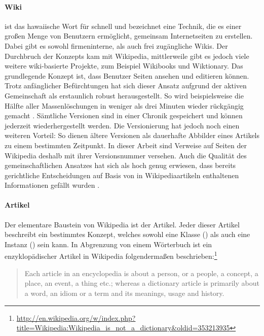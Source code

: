 \paragraph{Wiki}
ist das hawaiische Wort für schnell und bezeichnet eine Technik, die es einer großen Menge von Benutzern ermöglicht, gemeinsam Internetseiten zu erstellen.
Dabei gibt es sowohl firmeninterne, als auch frei zugängliche Wikis.
Der Durchbruch der Konzepts kam mit Wikipedia, mittlerweile gibt es jedoch viele weitere wiki-basierte Projekte, zum Beispiel Wikibooks und Wiktionary.
Das grundlegende Konzept ist, dass Benutzer Seiten ansehen und editieren können.
Trotz anfänglicher Befürchtungen hat sich dieser Ansatz aufgrund der aktiven Gemeinschaft als erstaunlich robust herausgestellt.
So wird beispielsweise die Hälfte aller Massenlöschungen in weniger als drei Minuten wieder rückgängig gemacht \citep[Seite 579]{wikipedia-vandalism}.
Sämtliche Versionen sind in einer Chronik gespeichert und können jederzeit wiederhergestellt werden.
Die Versionierung hat jedoch noch einen weiteren Vorteil:
So dienen ältere Versionen als dauerhafte Abbilder eines Artikels zu einem bestimmten Zeitpunkt.
In dieser Arbeit sind Verweise auf Seiten der Wikipedia deshalb mit ihrer Versionsnummer versehen.
Auch die Qualität des gemeinschaftlichen Ansatzes hat sich als hoch genug erwiesen, dass bereits gerichtliche Entscheidungen auf Basis von in Wikipediaartikeln enthaltenen Informationen gefällt wurden \citep*{wikipedia-formula-one}.

\paragraph{Artikel}
Der elementare Baustein von Wikipedia ist der Artikel.
Jeder dieser Artikel beschreibt ein bestimmtes Konzept, welches sowohl eine Klasse () als auch eine Instanz () sein kann.
In Abgrenzung von einem Wörterbuch ist ein enzyklopädischer Artikel in Wikipedia folgendermaßen beschrieben:\footnote{\url{http://en.wikipedia.org/w/index.php?title=Wikipedia:Wikipedia_is_not_a_dictionary&oldid=353213935}}
\begin{quote}
Each article in an encyclopedia is about a person, or a people, a concept, a place, an event, a thing etc.; whereas a dictionary article is primarily about a word, an idiom or a term and its meanings, usage and history.
\end{quote}

